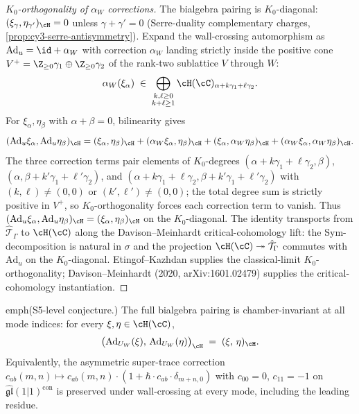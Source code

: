 \begin{proof}[$K_0$-orthogonality of $\alpha_W$ corrections]
 The bialgebra pairing is $K_0$-diagonal:
 $(\xi_\gamma, \eta_{\gamma'})_\cH = 0$ unless $\gamma + \gamma' = 0$
 (Serre-duality complementary charges,
 \cref{prop:cy3-serre-antisymmetry}). Expand the wall-crossing
 automorphism as $\mathrm{Ad}_u = \id + \alpha_W$ with correction
 $\alpha_W$ landing strictly inside the positive cone
 $V^+ = \Z_{\geq 0}\gamma_1 \oplus \Z_{\geq 0}\gamma_2$ of the rank-two
 sublattice $V$ through $W$:
 \[
 \alpha_W(\xi_\alpha) \;\in\; \bigoplus_{\substack{k, \ell \geq 0 \\ k + \ell \geq 1}}
 \cH(\cC)_{\alpha + k\gamma_1 + \ell\gamma_2}.
 \]
 For $\xi_\alpha, \eta_\beta$ with $\alpha + \beta = 0$, bilinearity
 gives
 \[
 (\mathrm{Ad}_u \xi_\alpha, \mathrm{Ad}_u \eta_\beta)_\cH
 = (\xi_\alpha, \eta_\beta)_\cH + (\alpha_W \xi_\alpha, \eta_\beta)_\cH
 + (\xi_\alpha, \alpha_W \eta_\beta)_\cH
 + (\alpha_W \xi_\alpha, \alpha_W \eta_\beta)_\cH.
 \]
 The three correction terms pair elements of $K_0$-degrees
 $(\alpha + k\gamma_1 + \ell\gamma_2, \beta)$,
 $(\alpha, \beta + k'\gamma_1 + \ell'\gamma_2)$, and
 $(\alpha + k\gamma_1 + \ell\gamma_2, \beta + k'\gamma_1 + \ell'\gamma_2)$
 with $(k, \ell) \neq (0, 0)$ or $(k', \ell') \neq (0, 0)$; the total
 degree sum is strictly positive in $V^+$, so $K_0$-orthogonality
 forces each correction term to vanish. Thus
 $(\mathrm{Ad}_u \xi_\alpha, \mathrm{Ad}_u \eta_\beta)_\cH
 = (\xi_\alpha, \eta_\beta)_\cH$ on the $K_0$-diagonal.
 The identity transports from $\hat{\mathcal{T}}_\Gamma$ to $\cH(\cC)$ along
 the Davison--Meinhardt critical-cohomology lift: the Sym-decomposition
 is natural in $\sigma$ and the projection
 $\cH(\cC) \twoheadrightarrow \hat{\mathcal{T}}_\Gamma$ commutes with
 $\mathrm{Ad}_u$ on the $K_0$-diagonal. Etingof--Kazhdan
 \cite[Prop.~3.4]{EtingofKazhdan1996} supplies the classical-limit
 $K_0$-orthogonality; Davison--Meinhardt (2020, arXiv:1601.02479)
 supplies the critical-cohomology instantiation.
\end{proof}

\begin{conjecture}
 \label{conj:hopf-pairing-all-mode-chamber-invariance}
\ClaimStatusConjectured
 emph{(S5-level conjecture.)}
 The full bialgebra pairing is chamber-invariant at all mode indices:
 for every $\xi, \eta \in \cH(\cC)$,
 \[
 \big(\mathrm{Ad}_{U_W}(\xi),\, \mathrm{Ad}_{U_W}(\eta)\big)_\cH
 \;=\; (\xi,\, \eta)_\cH.
 \]
 Equivalently, the asymmetric super-trace correction
 $c_{ab}(m, n) \mapsto c_{ab}(m, n) \cdot (1 + \hbar \cdot c_{ab} \cdot \delta_{m + n, 0})$
 with $c_{00} = 0$, $c_{11} = -1$ on $\widehat{\mathfrak{gl}}(1|1)^{\mathrm{con}}$
 is preserved under wall-crossing at every mode, including the leading
 residue.
\end{conjecture}

